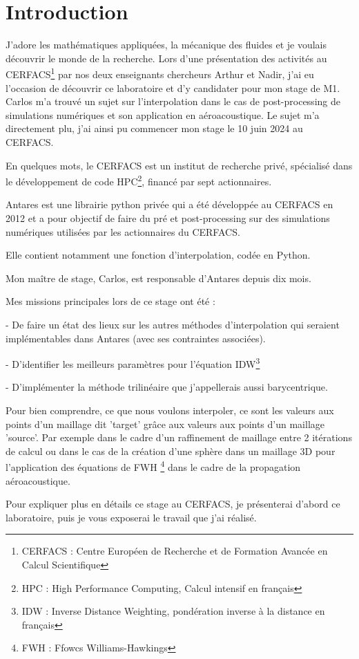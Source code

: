\section*{Introduction}

J'adore les mathématiques appliquées, la mécanique des fluides et je voulais découvrir le monde de la recherche. Lors d'une présentation des activités au
CERFACS\footnote{CERFACS : Centre Européen de Recherche et de Formation Avancée en Calcul Scientifique} par nos deux enseignants chercheurs Arthur et Nadir, j'ai eu l'occasion de découvrir ce laboratoire et d'y candidater pour mon stage de M1. Carlos m'a trouvé un sujet sur l'interpolation dans le cas de post-processing de simulations numériques et son application en aéroacoustique. Le sujet m'a directement plu, j'ai ainsi pu commencer mon stage le 10 juin 2024 au CERFACS.

En quelques mots, le CERFACS est un institut de recherche privé, spécialisé dans le développement de code HPC\footnote{HPC : High Performance Computing, Calcul intensif en français}, financé par sept actionnaires.

Antares est une librairie python privée qui a été développée au CERFACS en 2012 et a pour objectif de faire du pré et post-processing sur des simulations numériques utilisées par les actionnaires du CERFACS.

Elle contient notamment une fonction d'interpolation, codée en Python.

Mon maître de stage, Carlos, est responsable d'Antares depuis dix mois. 

Mes missions principales lors de ce stage ont été :

- De faire un état des lieux sur les autres méthodes d'interpolation qui seraient 
implémentables dans Antares (avec ses contraintes associées).

- D'identifier les meilleurs paramètres pour l'équation IDW\footnote{IDW : Inverse Distance Weighting, pondération inverse à la distance en français}

- D'implémenter la méthode trilinéaire que j'appellerais aussi barycentrique.

Pour bien comprendre, ce que nous voulons interpoler, ce sont les valeurs aux points d'un maillage dit 'target' grâce aux valeurs aux points d'un maillage 'source'. Par exemple dans le cadre d'un raffinement de maillage entre 2 itérations de calcul ou dans le cas de la création d'une sphère dans un maillage 3D pour l'application des équations de FWH \footnote{FWH : Ffowcs Williams-Hawkings} dans le cadre de la propagation aéroacoustique.

Pour expliquer plus en détails ce stage au CERFACS, je présenterai d'abord ce laboratoire, puis je vous exposerai le travail que j'ai réalisé.

% 
